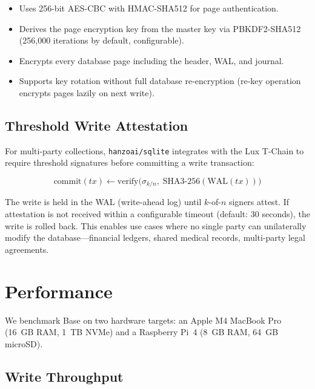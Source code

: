 \documentclass[11pt]{article}
\begin{document}
\begin{itemize}[leftmargin=1.1em]
    \item Uses 256-bit AES-CBC with HMAC-SHA512 for page authentication.
    \item Derives the page encryption key from the master key via PBKDF2-SHA512
    (256,000 iterations by default, configurable).
    \item Encrypts every database page including the header, WAL, and journal.
    \item Supports key rotation without full database re-encryption (re-key
    operation encrypts pages lazily on next write).
\end{itemize}

\subsection{Threshold Write Attestation}

For multi-party collections, \texttt{hanzoai/sqlite} integrates with the Lux
T-Chain to require threshold signatures before committing a write transaction:

\begin{equation}
\text{commit}(tx) \leftarrow \text{verify}\bigl(\sigma_{k/n},\;
\text{SHA3-256}(\text{WAL}(tx))\bigr)
\end{equation}

The write is held in the WAL (write-ahead log) until $k$-of-$n$ signers
attest. If attestation is not received within a configurable timeout
(default: 30 seconds), the write is rolled back. This enables use cases where
no single party can unilaterally modify the database---financial ledgers,
shared medical records, multi-party legal agreements.

\section{Performance}
\label{sec:performance}

We benchmark Base on two hardware targets: an Apple M4 MacBook Pro (16~GB RAM,
1~TB NVMe) and a Raspberry Pi~4 (8~GB RAM, 64~GB microSD).

\subsection{Write Throughput}
\end{document}
